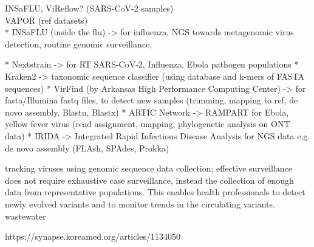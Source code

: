 INSaFLU, ViReflow? (SARS-CoV-2 samples) \\
 VAPOR (ref datasets) \\

* INSaFLU (inside the flu) -> for influenza, NGS towards metagenomic virus detection, routine genomic surveillance, 

* Nextstrain -> for RT SARS-CoV-2, Influenza, Ebola pathogen populations 
* Kraken2 -> taxonomic sequence classifier (using database and k-mers of FASTA sequences)
* VirFind (by Arkansas High Performance Computing Center) -> for fasta/Illumina fastq files, to detect new samples (trimming, mapping to ref, de novo assembly, Blastn, Blastx)
* ARTIC Network -> RAMPART for Ebola, yellow fever virus (read assignment, mapping, phylogenetic analysis on ONT data)
* IRIDA -> Integrated Rapid Infectious Disease Analysis for NGS data e.g. de novo assembly (FLAsh, SPAdes, Prokka)


tracking viruses using genomic sequence data collection; effective surveillance does not require exhaustive case surveillance, instead the collection of enough data from representative populations. This enables health professionals to detect newly evolved variants and to monitor trends in the circulating variants.\\
wastewater

https://synapse.koreamed.org/articles/1134050